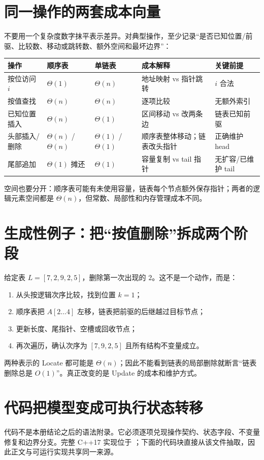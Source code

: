 \documentclass[UTF8,fontset=none,11pt,a4paper]{ctexart}
\begin{document}
\section{同一操作的两套成本向量}
不要用一个复杂度数字抹平表示差异。对典型操作，至少记录“是否已知位置/前驱、比较数、移动或跳转数、额外空间和最坏边界”：
\begin{center}\small
\begin{tabularx}{\linewidth}{L{2.5cm}C{1.8cm}C{1.8cm}YY}
\toprule
操作 & 顺序表 & 单链表 & 成本解释 & 关键前提\\
\midrule
按位访问 $i$ & $\Theta(1)$ & $\Theta(n)$ & 地址映射 vs 指针跳转 & $i$ 合法\\
按值查找 & $\Theta(n)$ & $\Theta(n)$ & 逐项比较 & 无额外索引\\
已知位置插入 & $\Theta(n)$ & $\Theta(1)$ & 区间移动 vs 改两条边 & 链表已知前驱\\
头部插入/删除 & $\Theta(n)$ / $\Theta(n)$ & $\Theta(1)$ / $\Theta(1)$ & 顺序表整体移动；链表改头指针 & 正确维护 head\\
尾部追加 & $\Theta(1)$ 摊还 & $\Theta(1)$ & 容量复制 vs tail 指针 & 无扩容/已维护 tail\\
\bottomrule
\end{tabularx}\end{center}
空间也要分开：顺序表可能有未使用容量，链表每个节点额外保存指针；两者的逻辑元素空间都是 $\Theta(n)$，但常数、局部性和内存管理成本不同。

\section{生成性例子：把“按值删除”拆成两个阶段}
给定表 $L=[7,2,9,2,5]$，删除第一次出现的 $2$。这不是一个动作，而是：
\begin{enumerate}
\item {}从头按逻辑次序比较，找到位置 $k=1$；
\item {}顺序表把 $A[2\ldots4]$ 左移，链表把前驱的后继越过目标节点；
\item {}更新长度、尾指针、空槽或回收节点；
\item {}再次遍历，确认次序为 $[7,9,2,5]$ 且所有结构不变量成立。
\end{enumerate}
两种表示的 Locate 都可能是 $\Theta(n)$；因此不能看到链表的局部删除就断言“链表删除总是 $O(1)$”。真正改变的是 Update 的成本和维护方式。

\section{代码把模型变成可执行状态转移}
代码不是本册结论之后的语法附录。它必须逐项兑现操作契约、状态字段、不变量修复和边界分支。完整 C++17 实现位于 ；下面的代码块直接从该文件抽取，因此正文与可运行实现共享同一来源。
\end{document}
